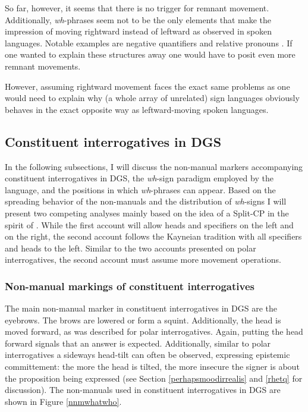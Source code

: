 \noindent So far, however, it seems that there is no trigger for remnant movement. Additionally, \textit{wh}-phrases seem not to be the only elements that make the impression of moving rightward instead of leftward as observed in spoken languages. Notable examples are negative quantifiers and relative pronouns \citep{cecchetto2009another}. If one wanted to explain these structures away one would have to posit even more remnant movements.

However, assuming rightward movement faces the exact same problems as one would need to explain why (a whole array of unrelated) sign languages obviously behaves in the exact opposite way as leftward-moving spoken languages.

\subsection{Constituent interrogatives in DGS}\label{whinterrogativedgs}


In the following subsections, I will discuss the non-manual markers accompanying constituent interrogatives in DGS, the \textit{wh}-sign paradigm employed by the language, and the positions in which \textit{wh}-phrases can appear. Based on the spreading behavior of the non-manuals and the distribution of \textit{wh}-signs I will present two competing analyses mainly based on the idea of a Split-CP in the spirit of \citet{van2010complex, van2012you}. While the first account will allow heads and specifiers on the left and on the right, the second account follows the Kayneian tradition with all specifiers and heads to the left. Similar to the two accounts presented on polar interrogatives, the second account must assume more movement operations.

\subsubsection{Non-manual markings of constituent interrogatives}
The main non-manual marker in constituent interrogatives in DGS are the eyebrows. The brows are lowered or form a squint. Additionally, the head is moved forward, as was described for polar interrogatives. Again, putting the head forward signals that an answer is expected. Additionally, similar to polar interrogatives a sideways head-tilt can often be observed, expressing epistemic committement: the more the head is tilted, the more insecure the signer is about the proposition being expressed (see Section \ref{perhapsmoodirrealis} and \ref{rhetq} for discussion). The non-manuals used in constituent interrogatives in DGS are shown in Figure \ref{nnmwhatwho}.


